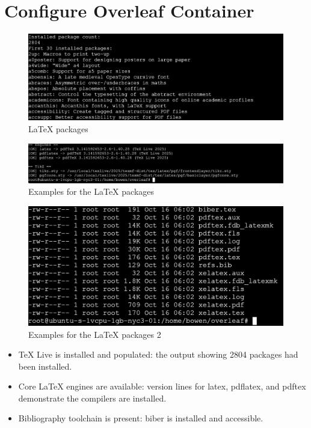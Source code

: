 \section{Configure Overleaf Container}
\begin{figure}[H]
  \centering
  \includegraphics[width=\textwidth]{png/packages.png}
  \caption{LaTeX packages}
  \vspace{-0.3cm}
\end{figure}

\begin{figure}[H]
  \centering
  \includegraphics[width=\textwidth]{png/proof.png}
  \caption{Examples for the LaTeX packages}
  \vspace{-0.3cm}
\end{figure}

\begin{figure}[H]
  \centering
  \includegraphics[width=\textwidth]{png/proof2.png}
  \caption{Examples for the LaTeX packages 2}
  \vspace{-0.3cm}
\end{figure}

\begin{itemize}
  \item TeX Live is installed and populated: the output showing 2804 packages had been installed.
  \item Core LaTeX engines are available: version lines for latex, pdflatex, and pdftex demonstrate the compilers are installed.
  \item Bibliography toolchain is present: biber is installed and accessible.
\end{itemize}


